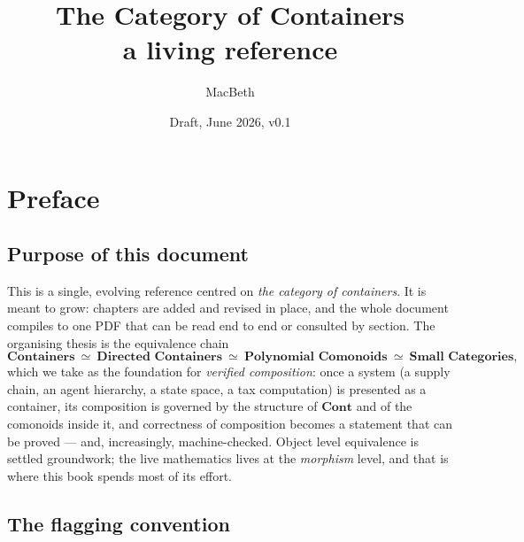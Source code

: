 \documentclass[11pt,a4paper]{book}
\title{\textbf{The Category of Containers}\\[0.4em]
  \large a living reference}
\author{MacBeth}
\date{Draft, June 2026, v0.1}
\newcommand{\Cont}{\mathbf{Cont}}
\theoremstyle{plain}
\theoremstyle{definition}
\theoremstyle{remark}
\begin{document}
\maketitle

\frontmatter
\tableofcontents

\chapter{Preface}

\section*{Purpose of this document}

This is a single, evolving reference centred on \emph{the category of
containers}. It is meant to grow: chapters are added and revised in place,
and the whole document compiles to one PDF that can be read end to end or
consulted by section. The organising thesis is the equivalence chain
\[
  \textbf{Containers} \ \simeq\ \textbf{Directed Containers}
  \ \simeq\ \textbf{Polynomial Comonoids} \ \simeq\ \textbf{Small Categories},
\]
which we take as the foundation for \emph{verified composition}: once a
system (a supply chain, an agent hierarchy, a state space, a tax computation)
is presented as a container, its composition is governed by the structure of
$\Cont$ and of the comonoids inside it, and correctness of composition becomes
a statement that can be proved --- and, increasingly, machine-checked. Object
level equivalence is settled groundwork; the live mathematics lives at the
\emph{morphism} level, and that is where this book spends most of its effort.

\section*{The flagging convention}
\end{document}
